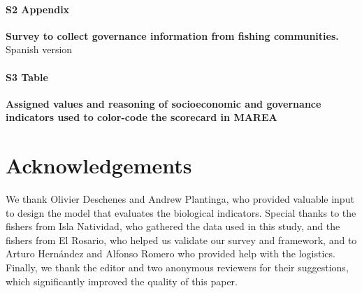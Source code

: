 \documentclass[10pt,letterpaper]{article}
\begin{document}
\paragraph*{S2 Appendix}
\label{S2_Appendix}
{\bf Survey to collect governance information from fishing communities.} Spanish version

\paragraph*{S3 Table}
\label{S3_Table}
{\bf Assigned values and reasoning of socioeconomic and governance indicators used to color-code the scorecard in MAREA}

\section*{Acknowledgements}\label{acknowledgements}

We thank Olivier Deschenes and Andrew Plantinga, who provided valuable input to design the model that evaluates the biological indicators. Special thanks to the fishers from Isla Natividad, who gathered the data used in this study, and the fishers from El Rosario, who helped us validate our survey and framework, and to Arturo Hernández and Alfonso Romero who provided help with the logistics. Finally, we thank the editor and two anonymous reviewers for their suggestions, which significantly improved the quality of this paper.

\nolinenumbers
\end{document}

